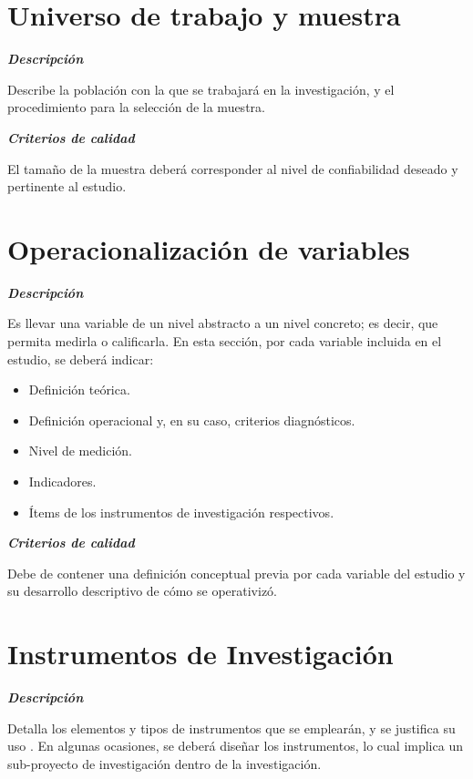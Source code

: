 \section{Universo de trabajo y muestra}

    \textbf{\textit{Descripción}}
    
    Describe la población con la que se trabajará en la investigación, y el procedimiento para la selección de la muestra.
    
    \textbf{\textit{Criterios de calidad}}
    
    El tamaño de la muestra deberá corresponder al nivel de confiabilidad deseado y pertinente al estudio.

\section{Operacionalización de variables}

    \textbf{\textit{Descripción}}
    
    Es llevar una variable de un nivel abstracto a un nivel concreto; es decir, que permita medirla o calificarla. En esta sección, por cada variable incluida en el estudio, se deberá indicar:
    
    \begin{itemize}
        \item Definición teórica.
        \item Definición operacional y, en su caso, criterios diagnósticos.
        \item Nivel de medición.
        \item Indicadores.
        \item Ítems de los instrumentos de investigación respectivos.
    \end{itemize}
    
    \textbf{\textit{Criterios de calidad}}
    
    Debe de contener una definición conceptual previa por cada variable del estudio y su desarrollo descriptivo de cómo se operativizó.

\section{Instrumentos de Investigación}

    \textbf{\textit{Descripción}}
    
    Detalla los elementos y tipos de instrumentos que se emplearán, y se justifica su uso \cite{latexcompanion}.
    En algunas ocasiones, se deberá diseñar los instrumentos, lo cual implica un sub-proyecto de investigación dentro de la investigación.
    
